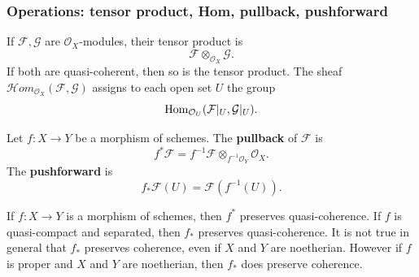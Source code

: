 \documentclass[12pt]{article}
\begin{document}
\subsubsection{Operations: tensor product, Hom, pullback, pushforward}

\begin{definition}
    If $\mathcal F,\mathcal G$ are $\mathcal O_X$-modules, their tensor product is
    \[
        \mathcal F \otimes_{\mathcal O_X} \mathcal G.
    \]
    If both are quasi-coherent, then so is the tensor product.
    The sheaf $\mathcal{H}om_{\mathcal O_X}(\mathcal F,\mathcal G)$ assigns to each open set $U$ the group
    \[
        \operatorname{Hom}_{\mathcal O_U}(\mathcal F|_U,\mathcal G|_U).
    \]
\end{definition}
\begin{definition}
    Let $f:X\to Y$ be a morphism of schemes. The \textbf{pullback} of $\mathcal F$ is
    \[
        f^*\mathcal F = f^{-1}\mathcal F \otimes_{f^{-1}\mathcal O_Y} \mathcal O_X.
    \]
    The \textbf{pushforward} is
    \[
        f_*\mathcal F(U) = \mathcal F(f^{-1}(U)).
    \]
\end{definition}

\begin{proposition}
    If $f:X\to Y$ is a morphism of schemes, then $f^*$ preserves quasi-coherence. If $f$ is quasi-compact and separated, then $f_*$ preserves quasi-coherence. It is not true in general that $f_*$ preserves coherence, even if $X$ and $Y$ are noetherian. However if $f$ is proper and $X$ and $Y$ are noetherian, then $f_*$ does preserve coherence.
\end{proposition}
\end{document}
